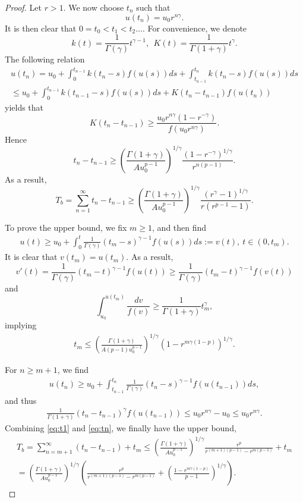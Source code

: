 \documentclass[12pt]{amsart}%
\theoremstyle{definition}
\theoremstyle{remark}
\renewcommand{\ge}{\geqslant}
\renewcommand{\le}{\leqslant}
\begin{document}
\begin{proof}
Let $r>1$. We now choose $t_n$ such that 
\[
u(t_n)=u_0 r^{n\gamma}.
\]
It is then clear that $0=t_0<t_1<t_2\ldots$. For convenience, we denote
\[
k(t)=\frac{1}{\Gamma(\gamma)}t^{\gamma-1}, ~~K(t)=\frac{1}{\Gamma(1+\gamma)}t^{\gamma}.
\]
The following relation
\begin{multline*}
u(t_n)=u_0+\int_0^{t_{n-1}}k(t_n-s)f(u(s))ds+\int_{t_{n-1}}^{t_n}k(t_n-s)f(u(s))ds\\
\le u_0+\int_0^{t_{n-1}}k(t_{n-1}-s)f(u(s))ds+K(t_n-t_{n-1})f(u(t_n))
\end{multline*}
yields that
\[
K(t_n-t_{n-1})\ge \frac{u_0r^{n\gamma}(1-r^{-\gamma})}{f(u_0 r^{n\gamma})}.
\]
Hence
 \begin{equation}\label{grow}
 t_n-t_{n-1}\ge \left(\frac{\Gamma(1+\gamma)}{Au_0^{p-1}}\right)^{1/\gamma}\frac{(1-r^{-\gamma})^{1/\gamma}}{ r^{n(p-1)}}.
\end{equation}
As a result,
\[
T_b=\sum_{n=1}^{\infty}t_n-t_{n-1} \ge  \left(\frac{\Gamma(1+\gamma)}{Au_0^{p-1}}\right)^{1/\gamma} \frac{(r^{\gamma}-1)^{1/\gamma}}{r(r^{p-1}-1)}.
\]

To prove the upper bound, we fix $m\ge 1$, and then find
\begin{gather}\label{eq:upperest}
u(t)\ge u_0+\int_{0}^{t}\frac{1}{\Gamma(\gamma)}(t_m-s)^{\gamma-1} f(u(s))ds:=v(t), ~t\in (0, t_m).
\end{gather}
It is clear that $v(t_m)=u(t_m)$. As a result, \[
v'(t)=\frac{1}{\Gamma(\gamma)}(t_m-t)^{\gamma-1}f(u(t))\ge \frac{1}{\Gamma(\gamma)}(t_m-t)^{\gamma-1}f(v(t))
\]
and \[
\int_{u_0}^{u(t_m)}\frac{dv}{f(v)} \ge \frac{1}{\Gamma(1+\gamma)}t_m^{\gamma},
\]
implying 
\begin{gather}\label{eq:t1}
t_m\le \left(\frac{\Gamma(1+\gamma)}{A(p-1)u_0^{p-1}}\right)^{1/\gamma}(1-r^{m\gamma(1-p)})^{1/\gamma}.
\end{gather}

For $n\ge m+1$, we find
\begin{gather*}
u(t_n)\ge u_0+\int_{t_{n-1}}^{t_n}\frac{1}{\Gamma(\gamma)}(t_n-s)^{\gamma-1} f(u(t_{n-1}))ds,
\end{gather*}
and thus 
\begin{gather}\label{eq:tn}
 \frac{1}{\Gamma(1+\gamma)}(t_n-t_{n-1})^{\gamma} f(u(t_{n-1}))\le u_0r^{n\gamma}-u_0\le u_0r^{n\gamma}.
\end{gather}
Combining \eqref{eq:t1} and \eqref{eq:tn}, we finally have the upper bound, 
\begin{multline*}
T_b=\sum_{n=m+1}^{\infty}(t_n-t_{n-1})+t_m\le \left(\frac{\Gamma(1+\gamma)}{Au_0^{p-1}}\right)^{1/\gamma}
\frac{r^p}{r^{(m+1)(p-1)}-r^{m(p-1)}}+t_m
\\
= \left(\frac{\Gamma(1+\gamma)}{Au_0^{p-1}}\right)^{1/\gamma}
\left(\frac{r^p}{r^{(m+1)(p-1)}-r^{m(p-1)}}+\left(\frac{1-r^{m\gamma(1-p)}}{p-1}\right)^{1/\gamma}\right).
\end{multline*}
\end{proof}
\end{document}
